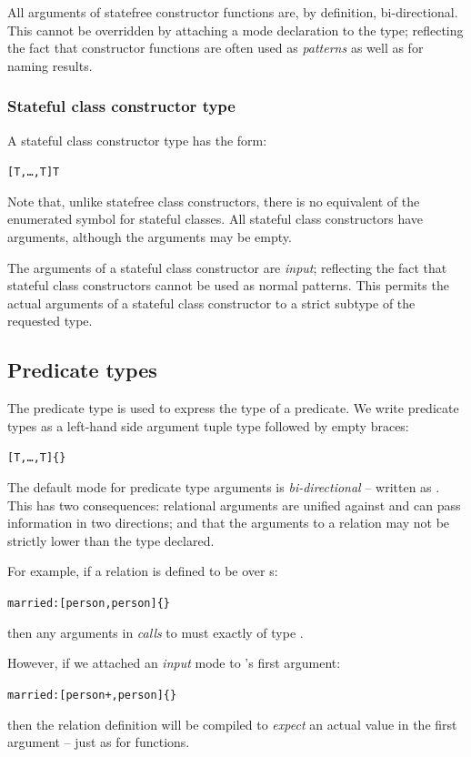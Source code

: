 All arguments of statefree constructor functions are, by definition, bi-directional. This cannot be overridden by attaching a mode declaration to the type; reflecting the fact that constructor functions are often used as \emph{patterns} as well as for naming results.

\subsubsection{Stateful class constructor type}
A stateful class constructor type has the form:
\begin{alltt}
[T,\ldots,T\subn]\sconarrow{}T
\end{alltt}
Note that, unlike statefree class constructors, there is no equivalent of the enumerated symbol for stateful classes. All stateful class constructors have arguments, although the arguments may be empty.

The arguments of a stateful class constructor are \emph{input}; reflecting the fact that stateful class constructors cannot be used as normal patterns. This permits the actual arguments of a stateful class constructor to a strict subtype of the requested type.

\subsection{Predicate types}
\label{types:predicate}
The predicate type is used to express the type of a predicate. We write predicate types as a left-hand side argument tuple type followed by empty braces:
\begin{alltt}
[T,\ldots,T\subn]\{\}
\end{alltt}

The default mode for predicate type arguments is \emph{bi-directional} -- written as \q{-+}. This has two consequences: relational arguments are unified against and can pass information in two directions; and that the arguments to a relation may not be strictly lower than the type declared.

For example, if a relation is defined to be over s:
\begin{alltt}
married:[person,person]\{\}
\end{alltt}
then any arguments in \emph{calls} to  must exactly of type .

However, if we attached an \emph{input} mode to 's first argument:
\begin{alltt}
married:[person+,person]\{\}
\end{alltt}
then the  relation definition will be compiled to \emph{expect} an actual value in the first argument -- just as for functions. 

